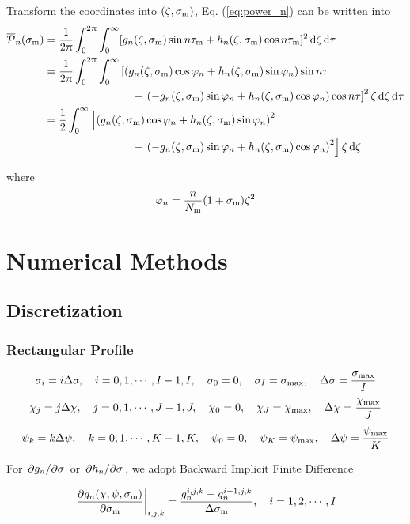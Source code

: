 \documentclass{article}
\begin{document}
Transform the coordinates into $(\zeta,\sigma_\text{m})$, Eq. 
(\ref{eq:power_n}) can be written into
\begin{align}
\overline{\mathcal{P}}_n (\sigma_\text{m})
&=
\frac{1}{2\uppi}\int_0^{2\uppi} \int_0^\infty
[g_n(\zeta,\sigma_\text{m})\sin n\tau_\text{m} + 
h_n(\zeta,\sigma_\text{m})\cos n\tau_\text{m}]^2\dd{\zeta}\dd{\tau}\nonumber\\
&=
\frac{1}{2\uppi}\int_0^{2\uppi} \int_0^\infty
\left[
	\qty(
	g_n(\zeta,\sigma_\text{m}) \cos\varphi_n+
	h_n(\zeta,\sigma_\text{m}) \sin\varphi_n
	)\sin n\tau \right.\nonumber\\
	&\qquad \qquad \qquad \qquad +\left.
	\qty(
	-g_n(\zeta,\sigma_\text{m}) \sin\varphi_n
	+
	h_n(\zeta,\sigma_\text{m}) \cos\varphi_n
	)\cos n\tau
\right]^2 \zeta\dd{\zeta}\dd{\tau}\\
&= \frac12 \int_0^\infty
\left[
	\qty(
	g_n(\zeta,\sigma_\text{m}) \cos\varphi_n+
	h_n(\zeta,\sigma_\text{m}) \sin\varphi_n
	)^2 \right.\nonumber\\
	&\qquad \qquad \qquad \qquad +\left.
	\qty(
	-g_n(\zeta,\sigma_\text{m}) \sin\varphi_n
	+
	h_n(\zeta,\sigma_\text{m}) \cos\varphi_n
	)^2
\right] \zeta\dd{\zeta}
\end{align}

where 
$$
\varphi_n = 
\frac{n}{N_\text{m}} (1+\sigma_\text{m}) \zeta^2
$$



\section{Numerical Methods}

\subsection{Discretization}
\subsubsection{Rectangular Profile}
$$
\sigma_i = i\Delta \sigma\qc i=0,1, \cdots, I-1, I\qc \sigma_0 = 0\qc \sigma_I = \sigma_\text{max}\qc \Delta\sigma = \frac{\sigma\st{max}}{I}
$$
$$
\chi_j = j\Delta \chi\qc j=0,1, \cdots, J-1, J\qc \chi_0 = 0\qc \chi_J = 
\chi_\text{max}\qc \Delta\chi = \frac{\chi\st{max}}{J}
$$
$$
\psi_k = k\Delta \psi\qc k=0,1, \cdots, K-1, K\qc \psi_0 = 0\qc \psi_K = \psi_\text{max}\qc \Delta\psi = \frac{\psi\st{max}}{K}
$$


For $\pdv*{g_n}{\sigma}$ or $\pdv*{h_n}{\sigma}$, we adopt Backward Implicit
Finite Difference

\begin{align}
	\left. \pdv{g_n(\chi,\psi,\sigma\st{m})}{\sigma\st{m}}\right|_{i,j,k} 
	= \frac{g_n^{i,j,k} - g_n^{i-1,j,k}}{\Delta \sigma\st{m}}\qc
	i = 1,2, \cdots, I
\end{align}
\end{document}
